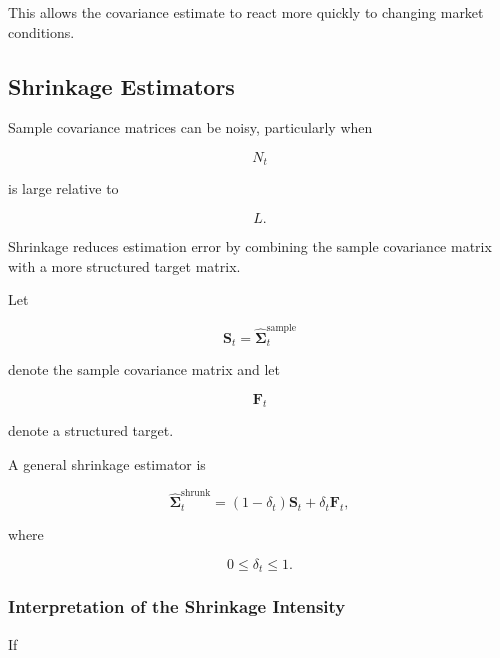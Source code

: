 \documentclass[11pt,a4paper]{article}
\begin{document}
This allows the covariance estimate to react more quickly to changing market
conditions.


\subsection{Shrinkage Estimators}
\label{subsec:shrinkage_covariance}

Sample covariance matrices can be noisy, particularly when

\begin{equation}
N_t
\end{equation}

is large relative to

\begin{equation}
L.
\end{equation}

Shrinkage reduces estimation error by combining the sample covariance matrix
with a more structured target matrix.

Let

\begin{equation}
\mathbf{S}_t
=
\widehat{\boldsymbol{\Sigma}}_t^{\mathrm{sample}}
\end{equation}

denote the sample covariance matrix and let

\begin{equation}
\mathbf{F}_t
\end{equation}

denote a structured target.

A general shrinkage estimator is

\begin{equation}
\boxed{
\widehat{\boldsymbol{\Sigma}}_t^{\mathrm{shrunk}}
=
(1-\delta_t)
\mathbf{S}_t
+
\delta_t
\mathbf{F}_t,
}
\end{equation}

where

\begin{equation}
0\leq\delta_t\leq1.
\end{equation}


\subsubsection{Interpretation of the Shrinkage Intensity}

If
\end{document}
